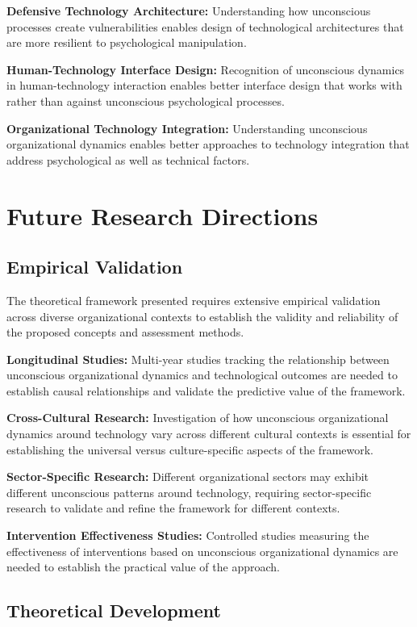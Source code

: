 \documentclass[10pt, twocolumn]{article}
\begin{document}
\textbf{Defensive Technology Architecture:} Understanding how unconscious processes create vulnerabilities enables design of technological architectures that are more resilient to psychological manipulation.

\textbf{Human-Technology Interface Design:} Recognition of unconscious dynamics in human-technology interaction enables better interface design that works with rather than against unconscious psychological processes.

\textbf{Organizational Technology Integration:} Understanding unconscious organizational dynamics enables better approaches to technology integration that address psychological as well as technical factors.

\section{Future Research Directions}

\subsection{Empirical Validation}

The theoretical framework presented requires extensive empirical validation across diverse organizational contexts to establish the validity and reliability of the proposed concepts and assessment methods.

\textbf{Longitudinal Studies:} Multi-year studies tracking the relationship between unconscious organizational dynamics and technological outcomes are needed to establish causal relationships and validate the predictive value of the framework.

\textbf{Cross-Cultural Research:} Investigation of how unconscious organizational dynamics around technology vary across different cultural contexts is essential for establishing the universal versus culture-specific aspects of the framework.

\textbf{Sector-Specific Research:} Different organizational sectors may exhibit different unconscious patterns around technology, requiring sector-specific research to validate and refine the framework for different contexts.

\textbf{Intervention Effectiveness Studies:} Controlled studies measuring the effectiveness of interventions based on unconscious organizational dynamics are needed to establish the practical value of the approach.

\subsection{Theoretical Development}
\end{document}
